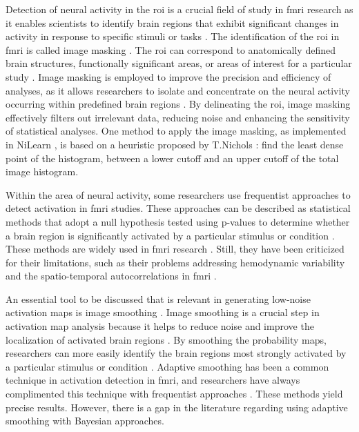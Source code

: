 Detection of neural activity in the \gls{roi} is a crucial field of study 
in \gls{fmri} research as it enables scientists to identify brain regions 
that exhibit significant changes in activity in response to specific stimuli 
or tasks \cite{ardekani1999activation}. The identification of the \gls{roi} 
in \gls{fmri} is called image masking \cite{peer2016intensity}. The \gls{roi} 
can correspond to anatomically defined brain structures, functionally 
significant areas, or areas of interest for a particular study 
\cite{poldrack2007region}. Image masking is employed to improve the precision 
and efficiency of analyses, as it allows researchers to isolate and concentrate 
on the neural activity occurring within predefined brain regions 
\cite{mitsis2008regions}. By delineating the \gls{roi}, image masking effectively 
filters out irrelevant data, reducing noise and enhancing the sensitivity of 
statistical analyses. One method to apply the image masking, as implemented in 
NiLearn \cite{abraham2014machine}, is based on a heuristic proposed by T.Nichols 
\cite{luo2003diagnosis}: find the least dense point of the histogram, between a 
lower cutoff and an upper cutoff of the total image histogram.

Within the area of neural activity, some researchers use frequentist approaches 
to detect activation in \gls{fmri} studies. These approaches can be described 
as statistical methods that adopt a null hypothesis tested using p-values to 
determine whether a brain region is significantly activated by a particular 
stimulus or condition \cite{friston2002classical, almodovar2019fast}. These 
methods are widely used in \gls{fmri} research 
\cite{almodovar2019fast, josephs1997event, worsley1995analysis, worsley1996searching}. 
Still, they have been criticized for their limitations, such as their problems 
addressing hemodynamic variability and the spatio-temporal autocorrelations in 
\gls{fmri} \cite{woolrich2012years}.

An essential tool to be discussed that is relevant in generating low-noise 
activation maps is image smoothing \cite{lee1983digital}. Image smoothing is a 
crucial step in activation map analysis because it helps to reduce noise and 
improve the localization of activated brain regions 
\cite{lindquist2010adaptive, strappini2017adaptive, garg2016quality}. By 
smoothing the probability maps, researchers can more easily identify the 
brain regions most strongly activated by a particular stimulus or condition
 \cite{tabelow2006analyzing}. Adaptive smoothing has been a common technique
  in activation detection in \gls{fmri}, and researchers have always complimented
   this technique with frequentist approaches 
   \cite{triantafyllou2006effect, mikl2008effects, liu2017functional}. These 
   methods yield precise results. However, there is a gap in the literature 
   regarding using adaptive smoothing with Bayesian approaches.

